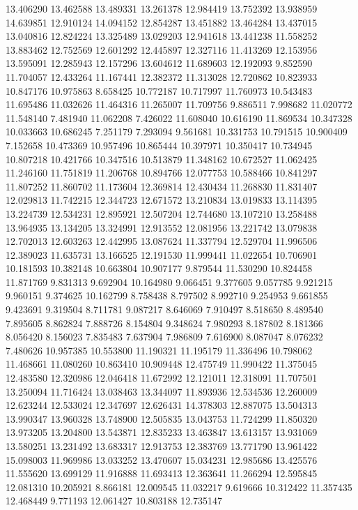 13.406290
13.462588
13.489331
13.261378
12.984419
13.752392
13.938959
14.639851
12.910124
14.094152
12.854287
13.451882
13.464284
13.437015
13.040816
12.824224
13.325489
13.029203
12.941618
13.441238
11.558252
13.883462
12.752569
12.601292
12.445897
12.327116
11.413269
12.153956
13.595091
12.285943
12.157296
13.604612
11.689603
12.192093
9.852590
11.704057
12.433264
11.167441
12.382372
11.313028
12.720862
10.823933
10.847176
10.975863
8.658425
10.772187
10.717997
11.760973
10.543483
11.695486
11.032626
11.464316
11.265007
11.709756
9.886511
7.998682
11.020772
11.548140
7.481940
11.062208
7.426022
11.608040
10.616190
11.869534
10.347328
10.033663
10.686245
7.251179
7.293094
9.561681
10.331753
10.791515
10.900409
7.152658
10.473369
10.957496
10.865444
10.397971
10.350417
10.734945
10.807218
10.421766
10.347516
10.513879
11.348162
10.672527
11.062425
11.246160
11.751819
11.206768
10.894766
12.077753
10.588466
10.841297
11.807252
11.860702
11.173604
12.369814
12.430434
11.268830
11.831407
12.029813
11.742215
12.344723
12.671572
13.210834
13.019833
13.114395
13.224739
12.534231
12.895921
12.507204
12.744680
13.107210
13.258488
13.964935
13.134205
13.324991
12.913552
12.081956
13.221742
13.079838
12.702013
12.603263
12.442995
13.087624
11.337794
12.529704
11.996506
12.389023
11.635731
13.166525
12.191530
11.999441
11.022654
10.706901
10.181593
10.382148
10.663804
10.907177
9.879544
11.530290
10.824458
11.871769
9.831313
9.692904
10.164980
9.066451
9.377605
9.057785
9.921215
9.960151
9.374625
10.162799
8.758438
8.797502
8.992710
9.254953
9.661855
9.423691
9.319504
8.711781
9.087217
8.646069
7.910497
8.518650
8.489540
7.895605
8.862824
7.888726
8.154804
9.348624
7.980293
8.187802
8.181366
8.056420
8.156023
7.835483
7.637904
7.986809
7.616900
8.087047
8.076232
7.480626
10.957385
10.553800
11.190321
11.195179
11.336496
10.798062
11.468661
11.080260
10.863410
10.909448
12.475749
11.990422
11.375045
12.483580
12.320986
12.046418
11.672992
12.121011
12.318091
11.707501
13.250094
11.716424
13.038463
13.344097
11.893936
12.534536
12.260009
12.623244
12.533024
12.347697
12.626431
14.378303
12.887075
13.504313
13.990347
13.960328
13.748900
12.505835
13.043753
11.724299
11.850320
13.973205
13.204800
13.543871
12.835233
13.463847
13.613157
13.931069
13.580251
13.231492
13.683317
12.913753
12.383769
13.771790
13.961422
15.098003
11.969986
13.033252
13.470607
15.034231
12.985686
13.425576
11.555620
13.699129
11.916888
11.693413
12.363641
11.266294
12.595845
12.081310
10.205921
8.866181
12.009545
11.032217
9.619666
10.312422
11.357435
12.468449
9.771193
12.061427
10.803188
12.735147
